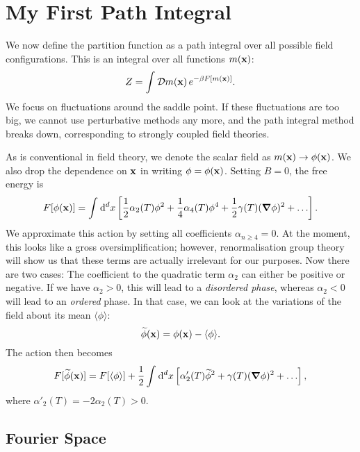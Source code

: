 \section{My First Path Integral}%
\label{sec:my_first_path_integral}

We now define the partition function as a path integral over all possible field configurations. This is an integral over all functions $m(\vb{x})$:
\begin{equation}
  Z = \int_{}^{} \mathop{\mathcal{D} m(\vb{x})} e^{-\beta F[m(\vb{x})]}.
\end{equation}
We focus on fluctuations around the saddle point. If these fluctuations are too big, we cannot use perturbative methods any more, and the path integral method breaks down, corresponding to strongly coupled field theories.

As is conventional in field theory, we denote the scalar field as $m(\vb{x}) \to \phi(\vb{x})$.
We also drop the dependence on $\vb{x}$ in writing $\phi = \phi(\vb{x})$.
Setting $B = 0$, the free energy is
\begin{equation}
  F[\phi(\vb{x})] = \int_{}^{} \dd[d]{x} \left[ \frac{1}{2} \alpha_2(T) \phi^2 + \frac{1}{4} \alpha_4(T) \phi^4 + \frac{1}{2} \gamma(T) (\grad \phi)^2 + \ldots \right].
\end{equation}
We approximate this action by setting all coefficients $\alpha_{n \geq 4} = 0$.
At the moment, this looks like a gross oversimplification; however, renormalisation group theory will show us that these terms are actually irrelevant for our purposes.
Now there are two cases: The coefficient to the quadratic term $\alpha_2$ can either be positive or negative.
If we have $\alpha_2 > 0$, this will lead to a \emph{disordered phase}, whereas $\alpha_2 < 0$ will lead to an \emph{ordered} phase.
In that case, we can look at the variations of the field about its mean $\langle \phi \rangle$:
\begin{equation}
  \widetilde \phi(\vb{x}) = \phi(\vb{x}) - \langle \phi \rangle.
\end{equation}
The action then becomes
\begin{equation}
  F[\widetilde \phi(\vb{x})] = F[\langle\phi\rangle] + \frac{1}{2} \int_{}^{} \dd[d]{x} \left[ \alpha_2' (T) \widetilde\phi^2 + \gamma(T) (\grad \phi)^2 + \ldots \right],
\end{equation}
where $\alpha'_2(T) = -2\alpha_2(T) > 0$.

\subsection{Fourier Space}%
\label{sub:fourier_space}

